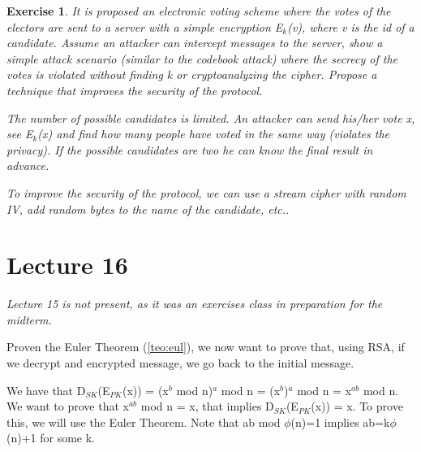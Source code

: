 \documentclass[a4paper, 12pt]{report}
\newtheorem{exercise}{\textbf{Exercise}}
\begin{document}
\begin{exercise}
	It is proposed an electronic voting scheme where the votes of the electors are sent to a server with a simple encryption E$_k$(v), where v is the id of a candidate. Assume an attacker can intercept messages to the server, show a simple attack scenario (similar to the codebook attack) where the secrecy of the votes is violated without finding k or cryptoanalyzing the cipher. Propose a technique that improves the security of the protocol.
	
	The number of possible candidates is limited. An attacker can send his/her vote x, see E$_k$(x) and find how many people have voted in the same way (violates the privacy). If the possible candidates are two he can know the final result in advance.
	
	To improve the security of the protocol, we can use a stream cipher with random IV, add random bytes to the name of the candidate, etc..
\end{exercise}

\chapter*{Lecture 16}
\textit{Lecture 15 is not present, as it was an exercises class in preparation for the midterm.}

\vspace{10mm}
Proven the Euler Theorem (\ref{teo:eul}), we now want to prove that, using RSA, if we decrypt and encrypted message, we go back to the initial message.

We have that D$_{SK}$(E$_{PK}$(x)) = (x$^b$ mod n)$^a$ mod n = (x$^b$)$^a$ mod n = x$^{ab}$ mod n. We want to prove that x$^{ab}$ mod n = x, that implies D$_{SK}$(E$_{PK}$(x)) = x. To prove this, we will use the Euler Theorem. Note that ab mod $\phi$(n)=1 implies ab=k$\phi$(n)+1 for some k.
\end{document}
